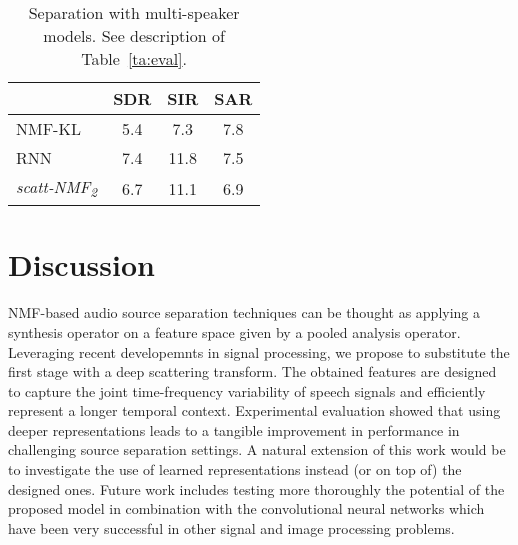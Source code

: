 \begin{table}[tb]
\caption{Separation with multi-speaker models.  See description of Table~\ref{ta:eval}. \label{ta:eval2}}
\vspace{-1.5ex}
\begin{center}
\small{
\begin{tabular}{l|c|c|c}
  \hline\hline
& SDR & SIR & SAR \\
\hline
NMF-KL     & 5.4 &   7.3 & 7.8 \\
\hline
RNN & 7.4  &   11.8 & 7.5  \\
\hline
\emph{scatt-NMF\textsubscript{2}} &  6.7 & 11.1  & 6.9 \\
  \hline\hline
\end{tabular}
}
\end{center}
\vspace{-1.5ex}
\end{table}

\section{Discussion}
NMF-based audio source separation techniques can be thought as applying a synthesis operator on a feature space
given by a pooled analysis operator. Leveraging recent developemnts in signal processing, we propose to substitute
the first stage with a deep scattering transform. 
The obtained features are designed to capture the joint time-frequency variability of speech signals
and efficiently represent a longer temporal context. Experimental evaluation showed that using deeper representations
leads to a tangible improvement in performance in challenging source separation settings.
A natural extension of this work would be to investigate the use of learned representations instead (or on top of)
the designed ones.
%
Future work includes testing more thoroughly the potential of the proposed model in combination
with the convolutional neural networks which have been very successful in other signal and image processing problems.


